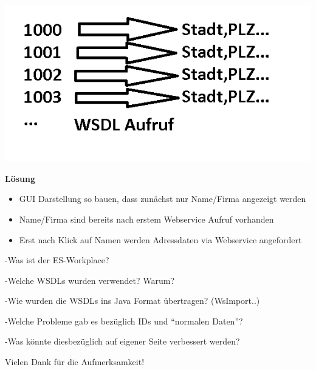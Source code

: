 \documentclass[xcolor={usenames,dvipsnames}, compress, 10pt]{beamer}
\begin{document}
\begin{frame}
\begin{center}

\includegraphics[width=\textheight]{Bilder/presi1.png} 

\end{center}
\end{frame}

\begin{frame}
\textbf{Lösung}
\begin{center}

\begin{itemize}
\item GUI Darstellung so bauen, dass zunächst nur Name/Firma angezeigt werden
\item Name/Firma sind bereits nach erstem Webservice Aufruf vorhanden
\item Erst nach Klick auf Namen werden Adressdaten via Webservice angefordert
\end{itemize}

\end{center}
\end{frame}

\begin{frame}
\begin{center}



\end{center}
\end{frame}

-Was ist der ES-Workplace?

-Welche WSDLs wurden verwendet? Warum?

-Wie wurden die WSDLs ins Java Format übertragen? (WsImport..)

-Welche Probleme gab es bezüglich IDs und ``normalen Daten''?

-Was könnte diesbezüglich auf eigener Seite verbessert werden?



\begin{frame}
\begin{center}
Vielen Dank f\"ur die Aufmerksamkeit!
\end{center}
\end{frame}
\end{document}
